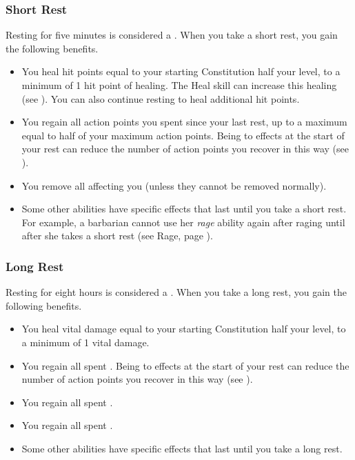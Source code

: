         \subsubsection{Short Rest}\label{Short Rest}
            Resting for five minutes is considered a .
            When you take a short rest, you gain the following benefits.
            \begin{itemize}
                \item You heal hit points equal to your starting Constitution \add half your level, to a minimum of 1 hit point of healing.
                    The Heal skill can increase this healing (see ).
                    You can also continue resting to heal additional hit points.
                \item You regain all action points you spent since your last rest, up to a maximum equal to half of your maximum action points.
                    Being  to effects at the start of your rest can reduce the number of action points you recover in this way (see ).
                \item You remove all  affecting you (unless they cannot be removed normally).
                \item Some other abilities have specific effects that last until you take a short rest.
                    For example, a barbarian cannot use her \textit{rage} ability again after raging until after she takes a short rest (see Rage, page ).
            \end{itemize}

        \subsubsection{Long Rest}\label{Long Rest}
            Resting for eight hours is considered a .
            When you take a long rest, you gain the following benefits.
            \begin{itemize}
                \item You heal vital damage equal to your starting Constitution \add half your level, to a minimum of 1 vital damage.
                \item You regain all spent .
                    Being  to effects at the start of your rest can reduce the number of action points you recover in this way (see ).
                \item You regain all spent .
                \item You regain all spent .
                \item Some other abilities have specific effects that last until you take a long rest.
            \end{itemize}

